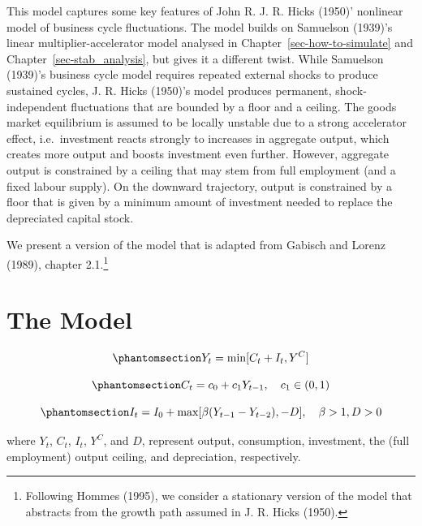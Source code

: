 \documentclass[
  letterpaper,
  DIV=11,
  numbers=noendperiod]{scrreprt}
\begin{document}
This model captures some key features of John R. J. R. Hicks (1950)'
nonlinear model of business cycle fluctuations. The model builds on
Samuelson (1939)'s linear multiplier-accelerator model analysed in
Chapter~\ref{sec-how-to-simulate} and Chapter~\ref{sec-stab_analysis},
but gives it a different twist. While Samuelson (1939)'s business cycle
model requires repeated external shocks to produce sustained cycles, J.
R. Hicks (1950)'s model produces permanent, shock-independent
fluctuations that are bounded by a floor and a ceiling. The goods market
equilibrium is assumed to be locally unstable due to a strong
accelerator effect, i.e.~investment reacts strongly to increases in
aggregate output, which creates more output and boosts investment even
further. However, aggregate output is constrained by a ceiling that may
stem from full employment (and a fixed labour supply). On the downward
trajectory, output is constrained by a floor that is given by a minimum
amount of investment needed to replace the depreciated capital stock.

We present a version of the model that is adapted from Gabisch and
Lorenz (1989), chapter 2.1.\footnote{Following Hommes (1995), we
  consider a stationary version of the model that abstracts from the
  growth path assumed in J. R. Hicks (1950).}

\section{The Model}\label{the-model-13}

\begin{equation}\phantomsection\label{eq-hicks_Y}{
  Y_{t}=\min[C_t + I_t, Y^C] 
}\end{equation}

\begin{equation}\phantomsection\label{eq-hicks_C}{
C_{t} = c_0 + c_1 Y_{t-1},  \quad c_1 \in (0,1)
}\end{equation}

\begin{equation}\phantomsection\label{eq-hicks_I}{
I_{t} = I_0 + \max[\beta(Y_{t-1} - Y_{t-2}), -D],  \quad \beta > 1, D >0 
}\end{equation}

where \(Y_t\), \(C_t\), \(I_t\), \(Y^C\), and \(D\), represent output,
consumption, investment, the (full employment) output ceiling, and
depreciation, respectively.
\end{document}
